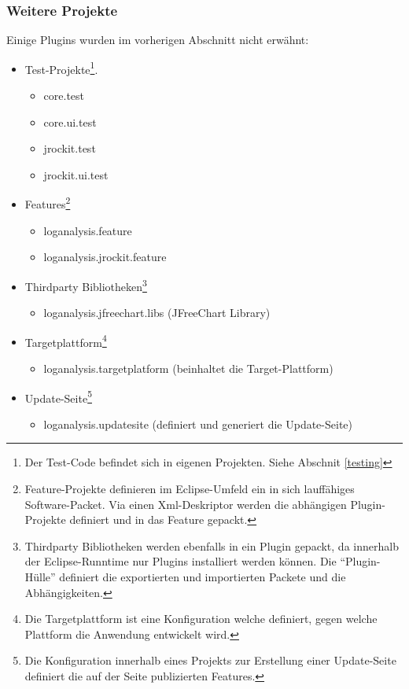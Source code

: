 \subsubsection{Weitere Projekte}
Einige Plugins wurden im vorherigen Abschnitt nicht erwähnt:
\begin{itemize}
	\item Test-Projekte\footnote{Der Test-Code befindet sich in eigenen Projekten. Siehe Abschnit \ref{testing} }.
		\begin{itemize}
			\item core.test
			\item core.ui.test
			\item jrockit.test
			\item jrockit.ui.test
		\end{itemize}
	\item  Features\footnote{Feature-Projekte definieren im Eclipse-Umfeld ein in sich lauffähiges Software-Packet. Via einen Xml-Deskriptor werden die abhängigen Plugin-Projekte definiert und in das Feature gepackt.}
		\begin{itemize}
			\item loganalysis.feature
			\item loganalysis.jrockit.feature
		\end{itemize}
	\item  Thirdparty Bibliotheken\footnote{Thirdparty Bibliotheken werden ebenfalls in ein Plugin gepackt, da innerhalb der Eclipse-Runntime nur Plugins installiert werden können. Die ``Plugin-Hülle'' definiert die exportierten und importierten Packete und die Abhängigkeiten.}
		\begin{itemize}
			\item  loganalysis.jfreechart.libs (JFreeChart Library)
		\end{itemize}
	\item  Targetplattform\footnote{Die Targetplattform ist eine Konfiguration welche definiert, gegen welche Plattform die Anwendung entwickelt wird.}
		\begin{itemize}
			\item  loganalysis.targetplatform (beinhaltet die Target-Plattform)
		\end{itemize}
	\item  Update-Seite\footnote{Die Konfiguration innerhalb eines Projekts zur Erstellung einer Update-Seite definiert die auf der Seite publizierten Features.}
		\begin{itemize}
			\item loganalysis.updatesite (definiert und generiert die Update-Seite)
		\end{itemize}
\end{itemize}

